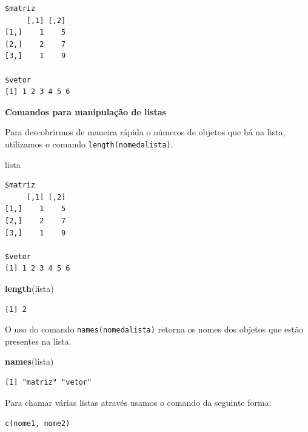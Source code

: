 \documentclass[12pt,portuguese,oneside]{book}
\newenvironment{Shaded}{\begin{snugshade}}{\end{snugshade}}
\newcommand{\KeywordTok}[1]{\textcolor[rgb]{0.13,0.29,0.53}{\textbf{#1}}}
\newcommand{\NormalTok}[1]{#1}
\begin{document}
\begin{verbatim}
$matriz
     [,1] [,2]
[1,]    1    5
[2,]    2    7
[3,]    1    9

$vetor
[1] 1 2 3 4 5 6
\end{verbatim}

\textbf{Comandos para manipulação de listas}

Para descobrirmos de maneira rápida o números de objetos que há na
lista, utilizamos o comando \texttt{length(nomedalista)}.

\begin{Shaded}
\begin{Highlighting}[]
\NormalTok{lista}
\end{Highlighting}
\end{Shaded}

\begin{verbatim}
$matriz
     [,1] [,2]
[1,]    1    5
[2,]    2    7
[3,]    1    9

$vetor
[1] 1 2 3 4 5 6
\end{verbatim}

\begin{Shaded}
\begin{Highlighting}[]
\KeywordTok{length}\NormalTok{(lista)}
\end{Highlighting}
\end{Shaded}

\begin{verbatim}
[1] 2
\end{verbatim}

O uso do comando \texttt{names(nomedalista)} retorna os nomes dos
objetos que estão presentes na lista.

\begin{Shaded}
\begin{Highlighting}[]
\KeywordTok{names}\NormalTok{(lista)}
\end{Highlighting}
\end{Shaded}

\begin{verbatim}
[1] "matriz" "vetor" 
\end{verbatim}

Para chamar várias listas através usamos o comando da seguinte forma:

\texttt{c(nome1,\ nome2)}
\end{document}
